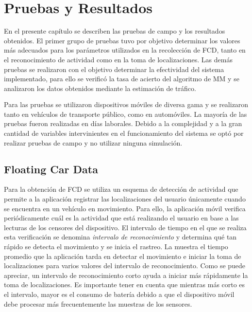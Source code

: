 \chapter{Pruebas y Resultados}
\label{cap:7}

En el presente capítulo se describen las pruebas de campo y los resultados obtenidos. El primer grupo de pruebas tuvo por objetivo determinar los valores más adecuados para los parámetros utilizados en la recolección de FCD, tanto en el reconocimiento de actividad como en la toma de localizaciones. Las demás pruebas se realizaron con el objetivo determinar la efectividad del sistema implementado, para ello se verificó la tasa de acierto del algoritmo de MM y se analizaron los datos obtenidos mediante la estimación de tráfico.

Para las pruebas se utilizaron dispositivos móviles de diversa gama y se realizaron tanto en vehículos de transporte público, como en automóviles. La mayoría de las pruebas fueron realizadas en días laborales. Debido a la complejidad y a la gran cantidad de variables intervinientes en el funcionamiento del sistema se optó por realizar pruebas de campo y no utilizar ninguna simulación.

\section{Floating Car Data}

Para la obtención de FCD se utiliza un esquema de detección de actividad que permite a la aplicación registrar las localizaciones del usuario únicamente cuando se encuentra en un vehículo en movimiento. Para ello, la aplicación móvil verifica periódicamente cuál es la actividad que está realizando el usuario en base a las lecturas de los censores del dispositivo. El intervalo de tiempo en el que se realiza esta verificación se denomina \emph{intervalo de reconocimiento} y determina qué tan rápido se detecta el movimiento y se inicia el rastreo. La  muestra el tiempo promedio que la aplicación tarda en detectar el movimiento e iniciar la toma de localizaciones para varios valores del intervalo de reconocimiento. Como se puede apreciar, un intervalo de reconocimiento corto ayuda a iniciar más rápidamente la toma de localizaciones. Es importante tener en cuenta que mientras más corto es el intervalo, mayor es el consumo de batería debido a que el dispositivo móvil debe procesar más frecuentemente las muestras de los sensores.

